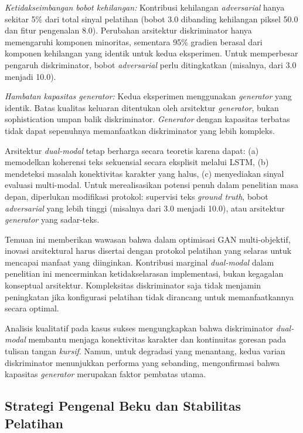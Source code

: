 \documentclass[journal]{IEEEtran}
\begin{document}
\textit{Ketidakseimbangan bobot kehilangan:} Kontribusi kehilangan \textit{adversarial} hanya sekitar 5\% dari total sinyal pelatihan (bobot 3.0 dibanding kehilangan piksel 50.0 dan fitur pengenalan 8.0). Perubahan arsitektur diskriminator hanya memengaruhi komponen minoritas, sementara 95\% gradien berasal dari komponen kehilangan yang identik untuk kedua eksperimen. Untuk memperbesar pengaruh diskriminator, bobot \textit{adversarial} perlu ditingkatkan (misalnya, dari 3.0 menjadi 10.0).

\textit{Hambatan kapasitas generator:} Kedua eksperimen menggunakan \textit{generator} yang identik. Batas kualitas keluaran ditentukan oleh arsitektur \textit{generator}, bukan sophistication umpan balik diskriminator. \textit{Generator} dengan kapasitas terbatas tidak dapat sepenuhnya memanfaatkan diskriminator yang lebih kompleks.

Arsitektur \textit{dual-modal} tetap berharga secara teoretis karena dapat: (a) memodelkan koherensi teks sekuensial secara eksplisit melalui LSTM, (b) mendeteksi masalah konektivitas karakter yang halus, (c) menyediakan sinyal evaluasi multi-modal. Untuk merealisasikan potensi penuh dalam penelitian masa depan, diperlukan modifikasi protokol: supervisi teks \textit{ground truth}, bobot \textit{adversarial} yang lebih tinggi (misalnya dari 3.0 menjadi 10.0), atau arsitektur \textit{generator} yang sadar-teks.

Temuan ini memberikan wawasan bahwa dalam optimisasi GAN multi-objektif, inovasi arsitektural harus disertai dengan protokol pelatihan yang selaras untuk mencapai manfaat yang diinginkan. Kontribusi marginal \textit{dual-modal} dalam penelitian ini mencerminkan ketidakselarasan implementasi, bukan kegagalan konseptual arsitektur. Kompleksitas diskriminator saja tidak menjamin peningkatan jika konfigurasi pelatihan tidak dirancang untuk memanfaatkannya secara optimal.

Analisis kualitatif pada kasus sukses mengungkapkan bahwa diskriminator \textit{dual-modal} membantu menjaga konektivitas karakter dan kontinuitas goresan pada tulisan tangan \textit{kursif}. Namun, untuk degradasi yang menantang, kedua varian diskriminator menunjukkan performa yang sebanding, mengonfirmasi bahwa kapasitas \textit{generator} merupakan faktor pembatas utama.

\subsection{Strategi Pengenal Beku dan Stabilitas Pelatihan}
\end{document}

